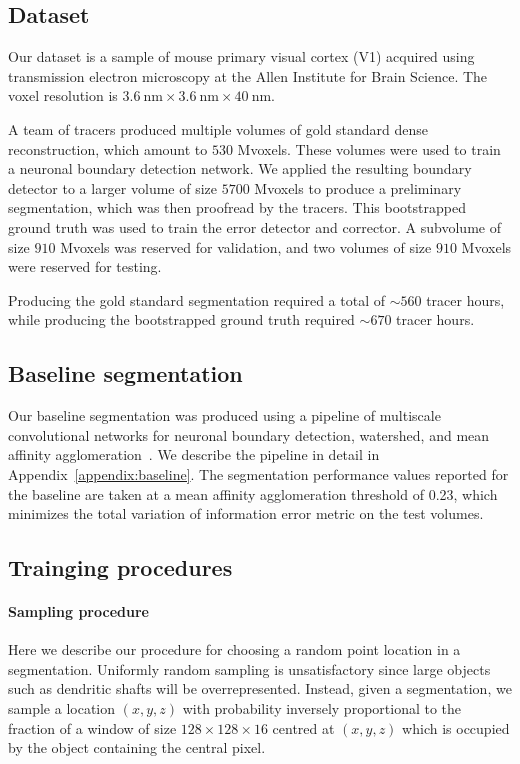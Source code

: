 \documentclass{article}
\begin{document}
\subsection{Dataset}


Our dataset is a sample of mouse primary visual cortex (V1) acquired using transmission electron microscopy at the Allen Institute for Brain Science. The voxel resolution is $3.6~\text{nm} \times 3.6~\text{nm} \times 40~\text{nm}$.

A team of tracers produced multiple volumes of gold standard dense reconstruction, which amount to $530$ Mvoxels. These volumes were used to train a neuronal boundary detection network. We applied the resulting boundary detector to a larger volume of size $5700$ Mvoxels to produce a preliminary segmentation, which was then proofread by the tracers. This bootstrapped ground truth was used to train the error detector and corrector. A subvolume of size $910$ Mvoxels was reserved for validation, and two volumes of size $910$ Mvoxels were reserved for testing.

Producing the gold standard segmentation required a total of $\sim 560$ tracer hours, while producing the bootstrapped ground truth required $\sim 670$ tracer hours.

\subsection{Baseline segmentation}
Our baseline segmentation was produced using a pipeline of multiscale convolutional networks for neuronal boundary detection, watershed, and mean affinity agglomeration~\cite{kisuk}. We describe the pipeline in detail in Appendix~\ref{appendix:baseline}. The segmentation performance values reported for the baseline are taken at a mean affinity agglomeration threshold of 0.23, which minimizes the total variation of information error metric on the test volumes.

\subsection{Trainging procedures}
\paragraph{Sampling procedure}
\label{sec:sampling}
Here we describe our procedure for choosing a random point location in a segmentation. Uniformly random sampling is unsatisfactory since large objects such as dendritic shafts will be overrepresented. Instead, given a segmentation, we sample a location $(x,y,z)$ with probability inversely proportional to the fraction of a window of size $128 \times 128 \times 16$ centred at $(x,y,z)$ which is occupied by the object containing the central pixel.
\end{document}
